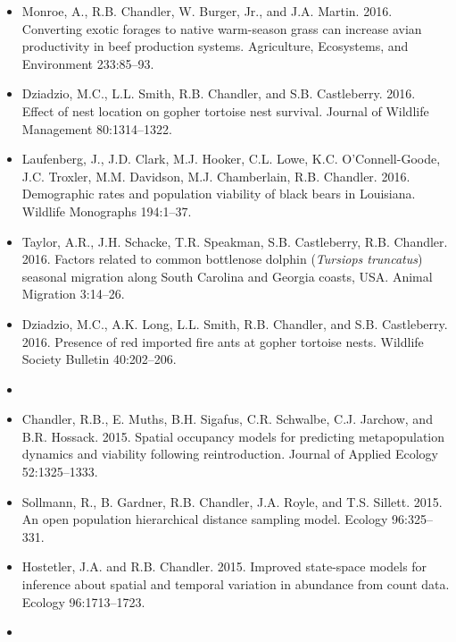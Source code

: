 \begin{itemize}
\item Monroe, A., R.B. Chandler, W. Burger, Jr., and J.A. Martin. 2016. 
  Converting exotic forages to native warm-season grass can
  increase avian productivity in beef production systems. Agriculture,
  Ecosystems, and Environment 233:85--93. 

\item Dziadzio, M.C., L.L. Smith, R.B. Chandler, and
  S.B. Castleberry. 2016. Effect of nest location on gopher
  tortoise nest survival. Journal of Wildlife Management 80:1314--1322.

\item Laufenberg, J., J.D. Clark, M.J. Hooker, C.L. Lowe,
  K.C. O'Connell-Goode, J.C. Troxler, M.M. Davidson, M.J. Chamberlain,
  R.B. Chandler. 2016. Demographic rates and population viability
  of black bears in Louisiana. Wildlife Monographs 194:1--37.

\item Taylor, A.R., J.H. Schacke, T.R. Speakman, S.B. Castleberry,
  R.B. Chandler. 2016. Factors related to common bottlenose dolphin
  ({\it Tursiops truncatus}) seasonal migration along South Carolina
  and Georgia coasts, USA. Animal Migration 3:14--26.

\item Dziadzio, M.C., A.K. Long, L.L. Smith, R.B. Chandler, and
  S.B. Castleberry. 2016. Presence of red imported fire ants at
  gopher tortoise nests. Wildlife Society Bulletin 40:202--206.  


\item[] { \\}

\item Chandler, R.B., E. Muths, B.H. Sigafus, C.R. Schwalbe,
  C.J. Jarchow, and B.R. Hossack. 2015. Spatial occupancy models for
  predicting metapopulation dynamics and viability following
  reintroduction. Journal of Applied Ecology 52:1325--1333.

\item Sollmann, R., B. Gardner, R.B. Chandler, J.A. Royle, and
  T.S. Sillett. 2015. An open population hierarchical
  distance sampling model. Ecology 96:325--331.

\item Hostetler, J.A. and R.B. Chandler. 2015. Improved
  state-space models for inference about spatial and temporal
  variation in abundance from count data. Ecology 96:1713--1723.

\item[] { \\}


\end{itemize}
